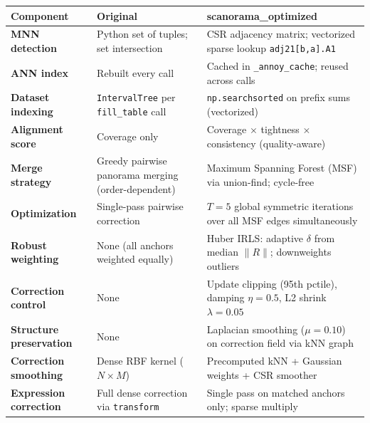\documentclass[8pt]{article}
\begin{document}
\renewcommand{\arraystretch}{1.3}
\begin{table}[ht]
\centering
\small
\begin{tabular}{@{}p{2.6cm} p{5.5cm} p{6.3cm}@{}}
\toprule
\textbf{Component} & \textbf{Original} & \textbf{scanorama\_optimized} \\
\midrule
\textbf{MNN detection} &
    Python set of tuples; set intersection &
    \textcolor{added}{CSR adjacency matrix; vectorized sparse lookup \texttt{adj21[b,a].A1}} \\
\addlinespace

\textbf{ANN index} &
    Rebuilt every call &
    \textcolor{added}{Cached in \texttt{\_annoy\_cache}; reused across calls} \\
\addlinespace

\textbf{Dataset indexing} &
    \texttt{IntervalTree} per \texttt{fill\_table} call &
    \textcolor{added}{\texttt{np.searchsorted} on prefix sums (vectorized)} \\
\addlinespace

\textbf{Alignment score} &
    Coverage only &
    \textcolor{added}{Coverage $\times$ tightness $\times$ consistency (quality-aware)} \\
\addlinespace

\textbf{Merge strategy} &
    Greedy pairwise panorama merging (order-dependent) &
    \textcolor{added}{Maximum Spanning Forest (MSF) via union-find; cycle-free} \\
\addlinespace

\textbf{Optimization} &
    Single-pass pairwise correction &
    \textcolor{added}{$T{=}5$ global symmetric iterations over all MSF edges simultaneously} \\
\addlinespace

\textbf{Robust weighting} &
    None (all anchors weighted equally) &
    \textcolor{added}{Huber IRLS: adaptive $\delta$ from median $\|R\|$; downweights outliers} \\
\addlinespace

\textbf{Correction control} &
    None &
    \textcolor{added}{Update clipping (95th pctile), damping $\eta{=}0.5$, L2 shrink $\lambda{=}0.05$} \\
\addlinespace

\textbf{Structure preservation} &
    None &
    \textcolor{added}{Laplacian smoothing ($\mu{=}0.10$) on correction field via kNN graph} \\
\addlinespace

\textbf{Correction smoothing} &
    Dense RBF kernel ($N \times M$) &
    \textcolor{added}{Precomputed kNN + Gaussian weights + CSR smoother} \\
\addlinespace

\textbf{Expression correction} &
    Full dense correction via \texttt{transform} &
    \textcolor{added}{Single pass on matched anchors only; sparse multiply} \\
\bottomrule
\end{tabular}
\end{table}
\end{document}
